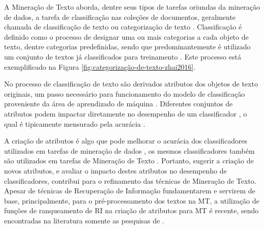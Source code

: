     
    
    A Mineração de Texto aborda, dentre seus tipos de tarefas oriundas da mineração de dados, a tarefa de classificação nas coleções de documentos, geralmente chamada de classificação de texto ou categorização de texto \cite[p.~35]{Zhai2016TDMA}.
    Classificação é definido como o processo de designar uma ou mais categorias a cada objeto de texto, dentre categorias predefinidas, sendo que predominantemente é utilizado um conjunto de textos já classificados para treinamento \cite[p.~7]{Jo2018TMCIBDC} \cite[p.~299]{Zhai2016TDMA}.
    Este processo está exemplificado na Figura \ref{fig:categorização-de-texto-zhai2016}.
    
    No processo de classificação de texto são derivados atributos dos objetos de texto originais, um passo necessário para funcionamento do modelo de classificação proveniente da área de aprendizado de máquina \cite[p.~64]{Feldman:2006:TMH:1076381}.
    Diferentes conjuntos de atributos podem impactar diretamente no desempenho de um classificador \cite[p.~304--306]{Zhai2016TDMA}, o qual é tipicamente mensurado pela acurácia\footnotemark{} \cite[p.~313--314]{Zhai2016TDMA} \cite[p.~9]{Jo2018TMCIBDC}.
    
    
    A criação de atributos\footnotemark{} é algo que pode melhorar o acurácia dos classificadores utilizados em tarefas de mineração de dados \cite[p.~118]{MaFEDS2018}, os mesmos classificadores também são utilizados em tarefas de Mineração de Texto \cite[p.~1241]{Sammut2017EMLDM}. 
    Portanto, sugerir a criação de novos atributos, e avaliar o impacto destes atributos no desempenho de classificadores, contribui para o refinamento das técnicas de Mineração de Texto.
    Apesar de técnicas de Recuperação de Informação fundamentarem e servirem de base, principalmente, para o pré-processamento dos textos na MT, a utilização de funções de ranqueamento de RI na criação de atributos para MT é recente, sendo encontradas na literatura somente as pesquisas de .
    

